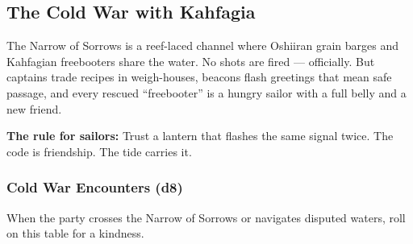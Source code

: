 \subsection*{The Cold War with Kahfagia}
\label{sec:oshiira-cold-war}

The Narrow of Sorrows is a reef-laced channel where Oshiiran grain barges and Kahfagian freebooters share the water. No shots are fired --- officially. But captains trade recipes in weigh-houses, beacons flash greetings that mean safe passage, and every rescued ``freebooter'' is a hungry sailor with a full belly and a new friend.

\textbf{The rule for sailors:} Trust a lantern that flashes the same signal twice. The code is friendship. The tide carries it.

\subsubsection*{Cold War Encounters (d8)}
When the party crosses the Narrow of Sorrows or navigates disputed waters, roll on this table for a kindness.

